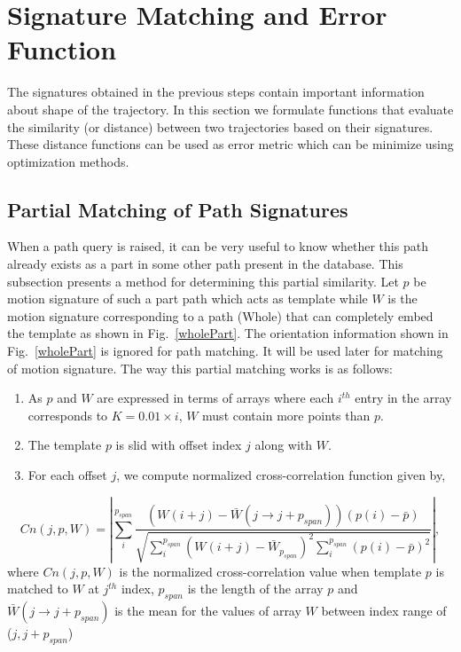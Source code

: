\documentclass[twocolumn,10pt]{asme2e}
\begin{document}
\section{Signature Matching and Error Function}\label{sec_distanceMetric}
The signatures obtained in the previous steps contain important information about shape of the trajectory.
In this section we formulate functions that evaluate the similarity (or distance) between two trajectories based on their signatures.
These distance functions can be used as error metric which can be minimize using optimization methods.

\subsection{Partial Matching of Path Signatures}\label{sec_ncc}
When a path query is raised, it can be very useful to know whether this path already exists as a part in some other path present in the database.
This subsection presents a method for determining this partial similarity.
Let $p$ be motion signature of such a part path which acts as template while $W$ is the motion signature corresponding to a path (Whole) that can completely embed the template as shown in Fig.~\ref{wholePart}. The orientation information shown in Fig.~\ref{wholePart} is ignored for path matching. It will be used later for matching of motion signature.
The way this partial matching works is as follows:

\begin{enumerate}
  \item As $p$ and $W$ are expressed in terms of arrays where each $i^{th}$ entry in the array corresponds to $K = 0.01\times i$, $W$ must contain more points than $p$.
  \item The template $p$ is slid with offset index $j$ along with $W$.
  \item For each offset $j$, we compute normalized cross-correlation function given by,
\end{enumerate}
\vspace{-0.6cm}
\begin{equation}\label{nccEq}
  Cn(j, p, W) = |\sum_{i}^{p_{span}} \frac{(W(i+j) - \bar{W}(j\to j + p_{span}))(p(i) - \bar{p})}{\sqrt{\sum_{i}^{p_{span}}{(W(i+j) - \bar{W}_{p_{span}})}^2\sum_{i}^{p_{span}}{(p(i) - \bar{p})}^2}} |,
\end{equation}
where $Cn(j, p, W)$ is the normalized cross-correlation value when template $p$ is matched to $W$ at $j^{th}$ index, $p_{span}$ is the length of the array $p$ and $\bar{W}(j\to j + p_{span})$ is the mean for the values of array $W$ between index range of ($j, j+p_{span}$)
\end{document}
